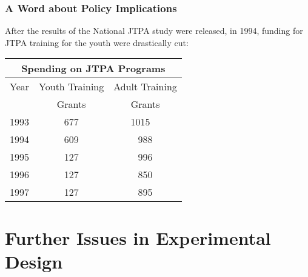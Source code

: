 \documentclass{beamer}
\numberwithin{equation}{section}
\begin{document}
 \begin{frame}
\frametitle{A Word about Policy Implications}

After the results of the National JTPA study were released, in 1994,
funding for JTPA training for the youth were drastically cut:
\medskip

\begin{center}
\begin{tabular}{lcc}
\multicolumn{3}{c}{\sc\small Spending on JTPA Programs}\vspace*{0.1cm}\\
\hline\hline
\multicolumn{1}{c}{Year}&\multicolumn{1}{c}{Youth Training}&\multicolumn{1}{c}{Adult Training}\\
&\multicolumn{1}{c}{Grants}&\multicolumn{1}{c}{Grants}\\\hline
1993&677&1015\ \ \\
1994&609&988\\
1995&127&996\\
1996&127&850\\
1997&127&895\\\hline
\end{tabular}
\end{center}
\end{frame}





\section{Further Issues in Experimental Design}\label{experimental-design}
\end{document}
